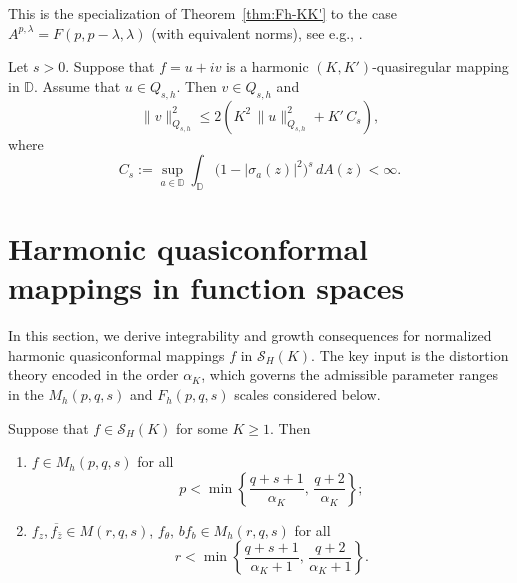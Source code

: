 \documentclass[12pt, reqno]{amsart}
\begin{document}
\begin{remark}
{\rm This is the specialization of Theorem~\ref{thm:Fh-KK'} to the case
$A^{p,\lambda}=F(p,p-\lambda,\lambda)$ (with equivalent norms), see e.g., \cite{YL,ZR,ZR1}.}
\end{remark}

\begin{coro}\label{coro:Qs-KK'}
Let $s>0$. Suppose that $f=u+iv$ is a harmonic $(K,K')$-quasiregular mapping in $\mathbb D$.
Assume that $u\in Q_{s,h}$.
Then $v\in Q_{s,h}$ and
\[
\|v\|_{Q_{s,h}}^{2}
\le
2\left(
K^{2}\,\|u\|_{Q_{s,h}}^{2}+K'\,C_{s}
\right),
\]
where
\[
C_{s}:=\sup_{a\in\mathbb D}\int_{\mathbb D}
\bigl(1-|\sigma_a(z)|^{2}\bigr)^{s}\,dA(z)<\infty.
\]
\end{coro}

\section{Harmonic quasiconformal mappings in function spaces}\label{section3}

\rm{In this section, we derive integrability and growth consequences for normalized harmonic quasiconformal mappings $f$ in $\mathcal S_H(K)$.
The key input is the distortion theory encoded in the order $\alpha_K$, which governs the admissible parameter ranges in the $M_h(p,q,s)$ and $F_h(p
,q,s)$ scales considered below.}

\begin{theorem}\label{M-th3}
Suppose that $f\in \mathcal{S}_H(K)$ for some $K\geq1$. Then
\begin{enumerate}
\item[(i)] $f\in M_h(p,q,s)$ for all
\begin{equation}\label{M_h(p,q,s)-p}
p<\min\left\{\frac{q+s+1}{\alpha_K},\,\frac{q+2}{\alpha_K}\right\};
\end{equation}
\item[(ii)] $f_z,\overline{f_{\bar z}}\in M(r,q,s)$, $f_{\theta},\,b f_b\in M_h(r,q,s)$ for all
\begin{equation}\label{M_h(p,q,s)-r}
r<\min\left\{\frac{q+s+1}{\alpha_K+1},\,\frac{q+2}{\alpha_K+1}\right\}.
\end{equation}
\end{enumerate}
\end{theorem}
\end{document}
